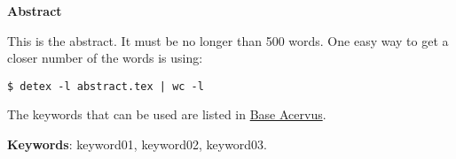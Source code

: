 \begin{center}
  \large{\textbf{Abstract}}
\end{center}

This is the abstract. It must be no longer than 500 words. One easy way to get
a closer number of the words is using:
\begin{lstlisting}
$ detex -l abstract.tex | wc -l
\end{lstlisting}

The keywords that can be used are listed in
\href{http://acervus.unicamp.br/}{Base Acervus}.

\vspace{.5cm}
\textbf{Keywords}:
keyword01, keyword02, keyword03.
